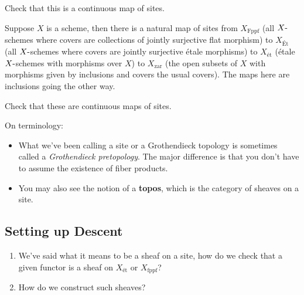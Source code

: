 \begin{exercise}[Check!]

Check that this is a continuous map of sites.

\end{exercise}

\begin{example}[?]

Suppose \(X\) is a scheme, then there is a natural map of sites from
\(X_{\mathrm{\operatorname{Fppf}}}\) (all \(X{\hbox{-}}\)schemes where
covers are collections of jointly surjective flat morphism) to
\(X_{\text{Ét}}\) (all \(X{\hbox{-}}\)schemes where covers are jointly
surjective étale morphisms) to \(X_{\text{ét}}\) (étale
\(X{\hbox{-}}\)schemes with morphisms over \(X\)) to
\(X_{{\mathrm{zar}}}\) (the open subsets of \(X\) with morphisms given
by inclusions and covers the usual covers). The maps here are inclusions
going the other way.

\end{example}

\begin{exercise}[Check!]

Check that these are continuous maps of sites.

\end{exercise}

\begin{remark}

\envlist

On terminology:

\begin{itemize}
\item
  What we've been calling a site or a Grothendieck topology is sometimes
  called a \emph{Grothendieck pretopology}. The major difference is that
  you don't have to assume the existence of fiber products.
\item
  You may also see the notion of a \textbf{topos}, which is the category
  of sheaves on a site.
\end{itemize}

\end{remark}

\hypertarget{setting-up-descent}{%
\subsection{Setting up Descent}\label{setting-up-descent}}

\begin{question}

\envlist

\begin{enumerate}
\def\labelenumi{\arabic{enumi}.}
\item
  We've said what it means to be a sheaf on a site, how do we check that
  a given functor is a sheaf on \(X_{\text{ét}}\) or
  \(X_{\mathrm{\operatorname{fppf}}}\)?
\item
  How do we construct such sheaves?
\end{enumerate}

\end{question}


